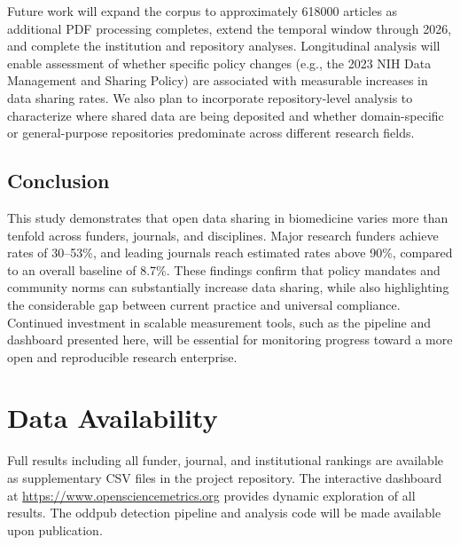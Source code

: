 Future work will expand the corpus to approximately \num{618000} articles as additional PDF processing completes, extend the temporal window through 2026, and complete the institution and repository analyses. Longitudinal analysis will enable assessment of whether specific policy changes (e.g., the 2023 NIH Data Management and Sharing Policy) are associated with measurable increases in data sharing rates. We also plan to incorporate repository-level analysis to characterize where shared data are being deposited and whether domain-specific or general-purpose repositories predominate across different research fields.

\subsection{Conclusion}

This study demonstrates that open data sharing in biomedicine varies more than tenfold across funders, journals, and disciplines. Major research funders achieve rates of 30--53\%, and leading journals reach estimated rates above 90\%, compared to an overall baseline of 8.7\%. These findings confirm that policy mandates and community norms can substantially increase data sharing, while also highlighting the considerable gap between current practice and universal compliance. Continued investment in scalable measurement tools, such as the pipeline and dashboard presented here, will be essential for monitoring progress toward a more open and reproducible research enterprise.


\section*{Data Availability}

Full results including all funder, journal, and institutional rankings are available as supplementary CSV files in the project repository. The interactive dashboard at \url{https://www.opensciencemetrics.org} provides dynamic exploration of all results. The oddpub detection pipeline and analysis code will be made available upon publication.
